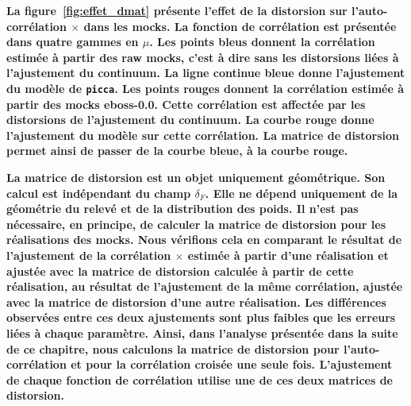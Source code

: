 \textbf{La figure~\ref{fig:effet_dmat} présente l'effet de la distorsion sur l'auto-corrélation \lya{}$\times$\lya{} dans les mocks. La fonction de corrélation est présentée dans quatre gammes en $\mu$. Les points bleus donnent la corrélation estimée à partir des raw mocks, c'est à dire sans les distorsions liées à l'ajustement du continuum. La ligne continue bleue donne l'ajustement du modèle de \texttt{picca}. Les points rouges donnent la corrélation estimée à partir des mocks eboss-0.0. Cette corrélation est affectée par les distorsions de l'ajustement du continuum. La courbe rouge donne l'ajustement du modèle sur cette corrélation. La matrice de distorsion permet ainsi de passer de la courbe bleue, à la courbe rouge.}

\textbf{La matrice de distorsion est un objet uniquement géométrique. Son calcul est indépendant du champ $\delta_F$. Elle ne dépend uniquement de la géométrie du relevé et de la distribution des poids.
  Il n'est pas nécessaire, en principe, de calculer la matrice de distorsion pour les \Nmocks{} réalisations des mocks.
  Nous vérifions cela en comparant le résultat de l'ajustement de la corrélation \lya{}$\times$\lya{} estimée à partir d'une réalisation et ajustée avec la matrice de distorsion calculée à partir de cette réalisation, au résultat de l'ajustement de la même corrélation, ajustée avec la matrice de distorsion d'une autre réalisation. Les différences observées entre ces deux ajustements sont plus faibles que les erreurs liées à chaque paramètre.
Ainsi, dans l'analyse présentée dans la suite de ce chapitre, nous calculons la matrice de distorsion pour l'auto-corrélation et pour la corrélation croisée une seule fois. L'ajustement de chaque fonction de corrélation utilise une de ces deux matrices de distorsion.}

